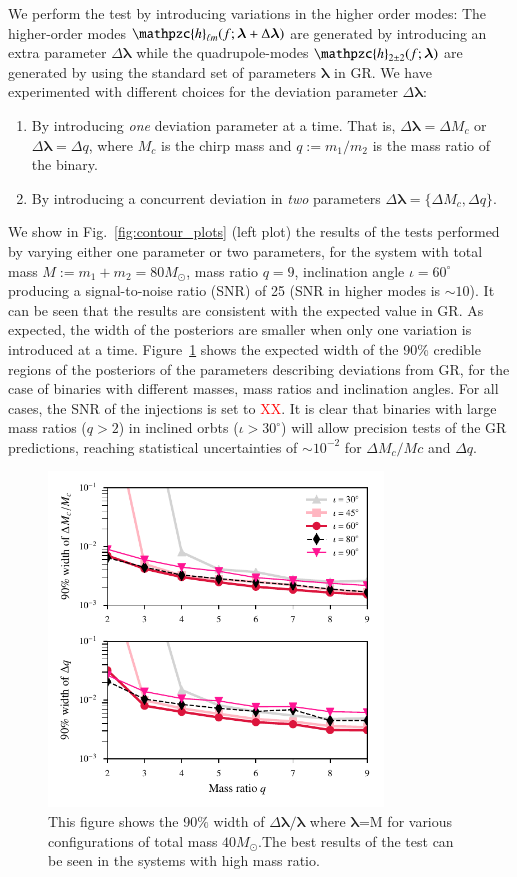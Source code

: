 \documentclass[prl,preprintnumbers,twocolumn,eqsecnum,floatfix,a4paper,nofootinbib,superscriptaddress]{revtex4}
\newcommand{\red}[1]{\textcolor{red}{#1}}
\newcommand{\h}{\mathpzc{h}}
\newcommand{\hlm}{\mathpzc{h}_{\ell m}}
\newcommand{\blambda}{\bm{\lambda}}
\begin{document}
We perform the test by introducing variations in the higher order modes: The higher-order modes $\hlm(f; \blambda+\Delta\blambda)$ are generated by introducing an extra parameter $\Delta\blambda$ while the quadrupole-modes $\h_{2\pm2}(f; \blambda)$ are generated by using the standard set of parameters $\blambda$ in GR. We have experimented with different choices for the deviation parameter $\Delta\blambda$: 
\begin{enumerate}
\item By introducing \emph{one} deviation parameter at a time. That is, $\Delta\blambda = {\Delta M_c}$ or $\Delta\blambda = {\Delta q}$, where $M_c$ is the chirp mass and $q := m_1/m_2$ is the mass ratio of the binary.
\item By introducing a concurrent deviation in \emph{two} parameters $\Delta \blambda = \{\Delta M_c, \Delta q\}$. 
\end{enumerate}
We show in Fig.~\ref{fig:contour_plots} (left plot) the results of the tests performed by varying either one parameter or two parameters, for the system with total mass $M := m_1 + m_2 = 80M_{\odot}$, mass ratio $q=9$, inclination angle $ {\iota}=60^{\circ} $ producing a signal-to-noise ratio  (SNR)  of 25 (SNR in higher modes is $\sim 10$). It can be seen that the results are consistent with the expected value in GR. As expected, the width of the posteriors are smaller when only one variation is introduced at a time. Figure~\ref{fig:dMc_dq_posteriors_gr} shows the expected width of the 90\% credible regions of the posteriors of the parameters describing deviations from GR, for the case of binaries with different masses, mass ratios and inclination angles. For all cases, the SNR of the injections is set to \red{XX}.  It is clear that binaries with large mass ratios ($q > 2$) in inclined orbts ($\iota > 30 ^\circ $) will allow precision tests of the GR predictions, reaching statistical uncertainties of $\sim 10^{-2}$ for $\Delta M_c/Mc$ and $\Delta q$.   

\begin{figure}[tbh]
	\includegraphics*[width=3.5in]{figs/fig3.pdf}
	\caption{This figure shows the 90$\%$ width of $\Delta \blambda/\blambda$ where $\blambda$=M for various configurations of total mass $40M_{\odot}$.The best results of the test can be seen in the systems with high mass ratio.}
	\label{fig:dMc_dq_posteriors_gr}
\end{figure}
\end{document}
